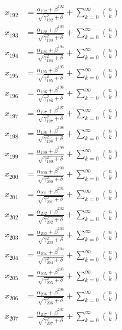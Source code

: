 \documentclass{article}
\begin{document}
\begin{align}
  x_{192} &= \frac{\alpha_{192} + \beta^{192}}{\sqrt{\gamma_{192}^2 + \delta}} + \sum_{k=0}^{\infty} \binom{n}{k} \label{eq:192} \\
  x_{193} &= \frac{\alpha_{193} + \beta^{193}}{\sqrt{\gamma_{193}^2 + \delta}} + \sum_{k=0}^{\infty} \binom{n}{k} \label{eq:193} \\
  x_{194} &= \frac{\alpha_{194} + \beta^{194}}{\sqrt{\gamma_{194}^2 + \delta}} + \sum_{k=0}^{\infty} \binom{n}{k} \label{eq:194} \\
  x_{195} &= \frac{\alpha_{195} + \beta^{195}}{\sqrt{\gamma_{195}^2 + \delta}} + \sum_{k=0}^{\infty} \binom{n}{k} \label{eq:195} \\
  x_{196} &= \frac{\alpha_{196} + \beta^{196}}{\sqrt{\gamma_{196}^2 + \delta}} + \sum_{k=0}^{\infty} \binom{n}{k} \label{eq:196} \\
  x_{197} &= \frac{\alpha_{197} + \beta^{197}}{\sqrt{\gamma_{197}^2 + \delta}} + \sum_{k=0}^{\infty} \binom{n}{k} \label{eq:197} \\
  x_{198} &= \frac{\alpha_{198} + \beta^{198}}{\sqrt{\gamma_{198}^2 + \delta}} + \sum_{k=0}^{\infty} \binom{n}{k} \label{eq:198} \\
  x_{199} &= \frac{\alpha_{199} + \beta^{199}}{\sqrt{\gamma_{199}^2 + \delta}} + \sum_{k=0}^{\infty} \binom{n}{k} \label{eq:199} \\
  x_{200} &= \frac{\alpha_{200} + \beta^{200}}{\sqrt{\gamma_{200}^2 + \delta}} + \sum_{k=0}^{\infty} \binom{n}{k} \label{eq:200} \\
  x_{201} &= \frac{\alpha_{201} + \beta^{201}}{\sqrt{\gamma_{201}^2 + \delta}} + \sum_{k=0}^{\infty} \binom{n}{k} \label{eq:201} \\
  x_{202} &= \frac{\alpha_{202} + \beta^{202}}{\sqrt{\gamma_{202}^2 + \delta}} + \sum_{k=0}^{\infty} \binom{n}{k} \label{eq:202} \\
  x_{203} &= \frac{\alpha_{203} + \beta^{203}}{\sqrt{\gamma_{203}^2 + \delta}} + \sum_{k=0}^{\infty} \binom{n}{k} \label{eq:203} \\
  x_{204} &= \frac{\alpha_{204} + \beta^{204}}{\sqrt{\gamma_{204}^2 + \delta}} + \sum_{k=0}^{\infty} \binom{n}{k} \label{eq:204} \\
  x_{205} &= \frac{\alpha_{205} + \beta^{205}}{\sqrt{\gamma_{205}^2 + \delta}} + \sum_{k=0}^{\infty} \binom{n}{k} \label{eq:205} \\
  x_{206} &= \frac{\alpha_{206} + \beta^{206}}{\sqrt{\gamma_{206}^2 + \delta}} + \sum_{k=0}^{\infty} \binom{n}{k} \label{eq:206} \\
  x_{207} &= \frac{\alpha_{207} + \beta^{207}}{\sqrt{\gamma_{207}^2 + \delta}} + \sum_{k=0}^{\infty} \binom{n}{k} \label{eq:207} \\

\end{align}
\end{document}

